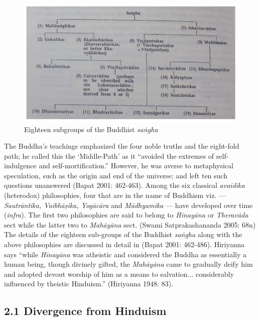 \begin{figure}[!h]
\includegraphics[scale=.35]{images/chap5-1.jpg}
\caption{Eighteen subgroups of the Buddhist \textit{saṅgha}}\label{chap5-fig1}
\end{figure}

The Buddha’s teachings emphasized the four noble truths and the eight-fold path; he called this the ‘Middle-Path’ as it “avoided the extremes of self-indulgence and self-mortification.” However, he was averse to metaphysical speculation, such as the origin and end of the universe; and left ten such questions unanswered (Bapat 2001: 462-463). Among the six classical \textit{avaidika} (heterodox) philosophies, four that are in the name of Buddhism viz. — \textit{Sautrāntika, Vaibhāṣika, Yogācāra} and \textit{Mādhyamika} — have developed over time (\textit{infra}). The first two philosophies are said to belong to \textit{Hīnayāna} or \textit{Theravāda} sect while the latter two to \textit{Mahāyāna} sect. (Swami Satprakashananda 2005: 68n) The details of the eighteen sub-groups of the Buddhist \textit{saṅgha} along with the above philosophies are discussed in detail in (Bapat 2001: 462-486). Hiriyanna says “while \textit{Hīnayāna} was atheistic and considered the Buddha as essentially a human being, though divinely gifted, the \textit{Mahāyāna} came to gradually deify him and adopted devout worship of him as a means to salvation... considerably influenced by theistic Hinduism.” (Hiriyanna 1948: 83).

\subsection*{2.1 Divergence from Hinduism}

